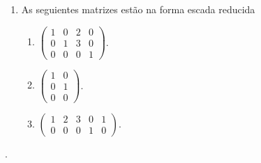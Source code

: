 \begin{example}
\begin{enumerate}
    \item As seguientes matrizes estão na forma escada reducida

          \begin{enumerate}
            \item

                  \begin{math}
                    \begin{pmatrix}
                      1 & 0 & 2 & 0 \\
                      0 & 1 & 3 & 0 \\
                      0 & 0 & 0 & 1
                    \end{pmatrix}
                  \end{math}.

            \item

                  \begin{math}
                    \begin{pmatrix}
                      1 & 0 \\
                      0 & 1 \\
                      0 & 0
                    \end{pmatrix}
                  \end{math}.


            \item

                  \begin{math}
                    \begin{pmatrix}
                      1 & 2 & 3 & 0 & 1 \\
                      0 & 0 & 0 & 1 & 0
                    \end{pmatrix}
                  \end{math}.
          \end{enumerate}

  \end{enumerate}
\end{example}

\begin{remark}
.
\end{remark}